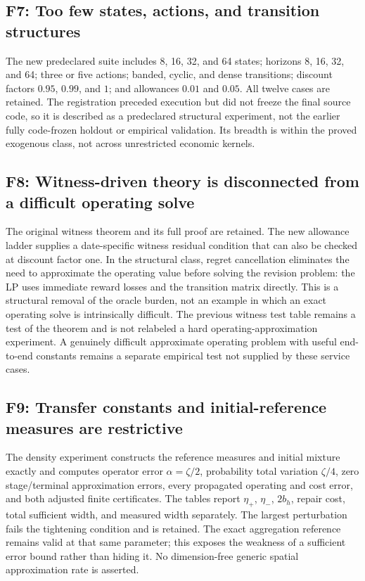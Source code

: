 \subsection*{F7: Too few states, actions, and transition structures}
The new predeclared suite includes 8, 16, 32, and 64 states; horizons 8, 16, 32, and 64; three or five actions; banded, cyclic, and dense transitions; discount factors $0.95$, $0.99$, and $1$; and allowances $0.01$ and $0.05$. All twelve cases are retained. The registration preceded execution but did not freeze the final source code, so it is described as a predeclared structural experiment, not the earlier fully code-frozen holdout or empirical validation. Its breadth is within the proved exogenous class, not across unrestricted economic kernels.

\subsection*{F8: Witness-driven theory is disconnected from a difficult operating solve}
The original witness theorem and its full proof are retained. The new allowance ladder supplies a date-specific witness residual condition that can also be checked at discount factor one. In the structural class, regret cancellation eliminates the need to approximate the operating value before solving the revision problem: the LP uses immediate reward losses and the transition matrix directly. This is a structural removal of the oracle burden, not an example in which an exact operating solve is intrinsically difficult. The previous witness test table remains a test of the theorem and is not relabeled a hard operating-approximation experiment. A genuinely difficult approximate operating problem with useful end-to-end constants remains a separate empirical test not supplied by these service cases.

\subsection*{F9: Transfer constants and initial-reference measures are restrictive}
The density experiment constructs the reference measures and initial mixture exactly and computes operator error $\alpha=\zeta/2$, probability total variation $\zeta/4$, zero stage/terminal approximation errors, every propagated operating and cost error, and both adjusted finite certificates. The tables report $\eta_+$, $\eta_-$, $2b_h$, repair cost, total sufficient width, and measured width separately. The largest perturbation fails the tightening condition and is retained. The exact aggregation reference remains valid at that same parameter; this exposes the weakness of a sufficient error bound rather than hiding it. No dimension-free generic spatial approximation rate is asserted.

